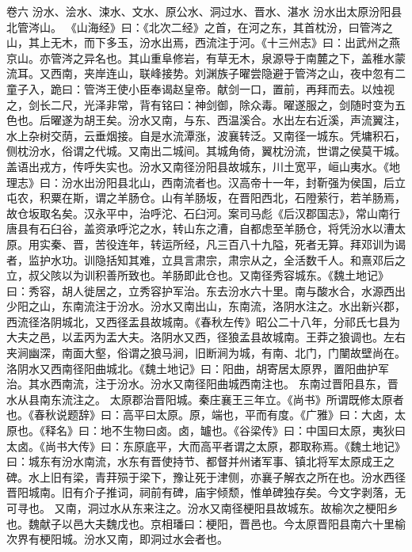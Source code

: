 \documentclass[12pt,UTF8]{ctexbook}
\begin{document}
卷六 汾水、浍水、涑水、文水、原公水、洞过水、晋水、湛水 
汾水出太原汾阳县北管涔山。
《山海经》曰：《北次二经》之首，在河之东，其首枕汾，曰管涔之山，其上无木，而下多玉，汾水出焉，西流注于河。《十三州志》曰：出武州之燕京山。亦管涔之异名也。其山重阜修岩，有草无木，泉源导于南麓之下，盖稚水蒙流耳。又西南，夹岸连山，联峰接势。刘渊族子曜尝隐避于管涔之山，夜中忽有二童子入，跪曰：管涔王使小臣奉谒赵皇帝。献剑一口，置前，再拜而去。以烛视之，剑长二尺，光泽非常，背有铭曰：神剑御，除众毒。曜遂服之，剑随时变为五色也。后曜遂为胡王矣。汾水又南，与东、西温溪合。水出左右近溪，声流翼注，水上杂树交荫，云垂烟接。自是水流潭涨，波襄转泛。又南径一城东。凭墉积石，侧枕汾水，俗谓之代城。又南出二城间。其城角倚，翼枕汾流，世谓之侯莫干城。盖语出戎方，传呼失实也。汾水又南径汾阳县故城东，川土宽平，峘山夷水。《地理志》曰：汾水出汾阳县北山，西南流者也。汉高帝十一年，封靳强为侯国，后立屯农，积粟在斯，谓之羊肠仓。山有羊肠坂，在晋阳西北，石隥萦行，若羊肠焉，故仓坂取名矣。汉永平中，治呼沱、石臼河。案司马彪《后汉郡国志》，常山南行唐县有石臼谷，盖资承呼沱之水，转山东之漕，自都虑至羊肠仓，将凭汾水以漕太原。用实秦、晋，苦役连年，转运所经，凡三百八十九隘，死者无算。拜邓训为谒者，监护水功。训隐括知其难，立具言肃宗，肃宗从之，全活数千人。和熹邓后之立，叔父陔以为训积善所致也。羊肠即此仓也。又南径秀容城东。《魏土地记》曰：秀容，胡人徙居之，立秀容护军治。东去汾水六十里。南与酸水合，水源西出少阳之山，东南流注于汾水。汾水又南出山，东南流，洛阴水注之。水出新兴郡，西流径洛阴城北，又西径盂县故城南。《春秋左传》昭公二十八年，分祁氏七县为大夫之邑，以盂丙为盂大夫。洛阴水又西，径狼孟县故城南。王莽之狼调也。左右夹涧幽深，南面大壑，俗谓之狼马涧，旧断涧为城，有南、北门，门闉故壁尚在。洛阴水又西南径阳曲城北。《魏土地记》曰：阳曲，胡寄居太原界，置阳曲护军治。其水西南流，注于汾水。汾水又南径阳曲城西南注也。
东南过晋阳县东，晋水从县南东流注之。
太原郡治晋阳城。秦庄襄王三年立。《尚书》所谓既修太原者也。《春秋说题辞》曰：高平曰太原。原，端也，平而有度。《广雅》曰：大卤，太原也。《释名》曰：地不生物曰卤。卤，罏也。《谷梁传》曰：中国曰太原，夷狄曰太卤。《尚书大传》曰：东原底平，大而高平者谓之太原，郡取称焉。《魏土地记》曰：城东有汾水南流，水东有晋使持节、都督并州诸军事、镇北将军太原成王之碑。水上旧有梁，青荓殒于梁下，豫让死于津侧，亦襄子解衣之所在也。汾水西径晋阳城南。旧有介子推词，祠前有碑，庙宇倾颓，惟单碑独存矣。今文字剥落，无可寻也。
又南，洞过水从东来注之。汾水又南径梗阳县故城东。故榆次之梗阳乡也。魏献子以邑大夫魏戊也。京相璠曰：梗阳，晋邑也。今太原晋阳县南六十里榆次界有梗阳城。汾水又南，即洞过水会者也。
\end{document}
